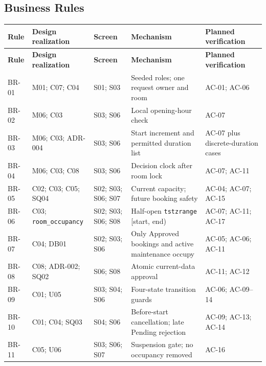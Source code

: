 \subsection{Business Rules}
\begingroup
\small
{}
\setlength{\tabcolsep}{2pt}
\renewcommand{\arraystretch}{1.1}
\begin{longtable}{|>{\raggedright\arraybackslash}p{}|>{\raggedright\arraybackslash}p{}|>{\raggedright\arraybackslash}p{}|>{\raggedright\arraybackslash}p{}|>{\raggedright\arraybackslash}p{}|}
\hline
\textbf{Rule} & \textbf{Design realization} & \textbf{Screen} & \textbf{Mechanism} & \textbf{Planned verification} \\
\hline
\endfirsthead
\hline
\textbf{Rule} & \textbf{Design realization} & \textbf{Screen} & \textbf{Mechanism} & \textbf{Planned verification} \\
\hline
\endhead
\hline
\endfoot
\hline
\endlastfoot
BR-01 & M01; C07; C04 & S01; S03 & Seeded roles; one request owner and room & AC-01; AC-06 \\ \hline
BR-02 & M06; C03 & S03; S06 & Local opening-hour check & AC-07 \\ \hline
BR-03 & M06; C03; ADR-004 & S03; S06 & Start increment and permitted duration list & AC-07 plus discrete-duration cases \\ \hline
BR-04 & M06; C03; C08 & S03; S06 & Decision clock after room lock & AC-07; AC-11 \\ \hline
BR-05 & C02; C03; C05; SQ04 & S02; S03; S06; S07 & Current capacity; future booking safety & AC-04; AC-07; AC-15 \\ \hline
BR-06 & C03; \texttt{room\_occupancy} & S02; S03; S06; S08 & Half-open \texttt{tstzrange} [start, end) & AC-07; AC-11; AC-17 \\ \hline
BR-07 & C04; DB01 & S02; S03; S06 & Only Approved bookings and active maintenance occupy & AC-05; AC-06; AC-11 \\ \hline
BR-08 & C08; ADR-002; SQ02 & S06; S08 & Atomic current-data approval & AC-11; AC-12 \\ \hline
BR-09 & C01; U05 & S03; S04; S06 & Four-state transition guards & AC-06; AC-09--14 \\ \hline
BR-10 & C01; C04; SQ03 & S04; S06 & Before-start cancellation; late Pending rejection & AC-09; AC-13; AC-14 \\ \hline
BR-11 & C05; U06 & S03; S06; S07 & Suspension gate; no occupancy removed & AC-16 \\ \hline

\end{longtable}
